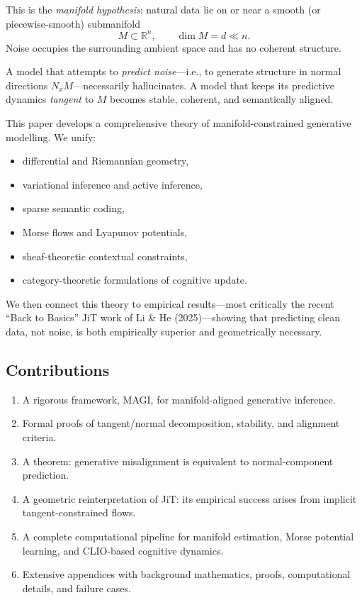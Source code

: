 \documentclass[11pt,a4paper,twocolumn]{article}
\begin{document}
This is the \emph{manifold hypothesis}: natural data lie on or near a
smooth (or piecewise-smooth) submanifold
\[
M \subset \mathbb{R}^n, \qquad \dim M = d \ll n.
\]
Noise occupies the surrounding ambient space and has no coherent
structure.

A model that attempts to \emph{predict noise}—i.e., to generate 
structure in normal directions $N_x M$—necessarily hallucinates. A
model that keeps its predictive dynamics \emph{tangent} to $M$ becomes
stable, coherent, and semantically aligned.

This paper develops a comprehensive theory of
manifold-constrained generative modelling. We unify:
\begin{itemize}
\item differential and Riemannian geometry,
\item variational inference and active inference,
\item sparse semantic coding,
\item Morse flows and Lyapunov potentials,
\item sheaf-theoretic contextual constraints,
\item category-theoretic formulations of cognitive update.
\end{itemize}

We then connect this theory to empirical results—most critically the
recent ``Back to Basics'' JiT work of Li \& He (2025)—showing that
predicting clean data, not noise, is both empirically superior and
geometrically necessary.

\subsection{Contributions}

\begin{enumerate}
\item A rigorous framework, MAGI, for manifold-aligned generative inference.
\item Formal proofs of tangent/normal decomposition, stability, and
alignment criteria.
\item A theorem: generative misalignment is equivalent to normal-component
prediction.
\item A geometric reinterpretation of JiT: its empirical success arises
from implicit tangent-constrained flows.
\item A complete computational pipeline for manifold estimation, Morse
potential learning, and CLIO-based cognitive dynamics.
\item Extensive appendices with background mathematics, proofs,
computational details, and failure cases.
\end{enumerate}
\end{document}
